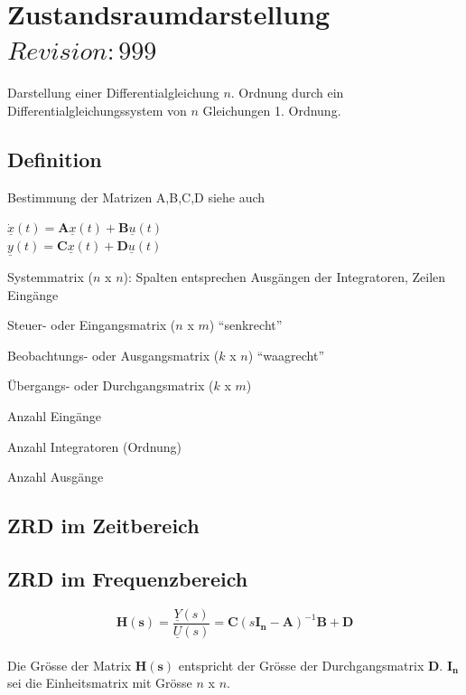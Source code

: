\section{Zustandsraumdarstellung  \tiny{$Revision: 999 $}}
Darstellung einer Differentialgleichung $n$. Ordnung durch ein
Differentialgleichungssystem von $n$ Gleichungen 1. Ordnung.

\subsection{Definition }
\begin{multicols}{2}
	
	Bestimmung der Matrizen A,B,C,D siehe auch 
	
	$\dot{\underline{x}}(t) = {\boldsymbol A} \underline{x}(t) + {\boldsymbol B} \underline{u}(t)$ \\
	$\underline{y}(t) = {\boldsymbol C} \underline{x}(t) + {\boldsymbol D} \underline{u}(t)$
		
	\begin{description}[noitemsep, style=multiline, leftmargin=15pt]
  		\item[A] Systemmatrix ($n$ x $n$): Spalten entsprechen Ausgängen der Integratoren, Zeilen Eingänge
  		\item[B] Steuer- oder Eingangsmatrix ($n$ x $m$) ``senkrecht''
  		\item[C] Beobachtungs- oder Ausgangsmatrix ($k$ x $n$) ``waagrecht''
  		\item[D] Übergangs- oder Durchgangsmatrix ($k$ x $m$) \\
  		\item[m] Anzahl Eingänge
  		\item[n] Anzahl Integratoren (Ordnung)
  		\item[k] Anzahl Ausgänge
	\end{description}	
\end{multicols}

\subsection{ZRD im Zeitbereich }

\subsection{ZRD im Frequenzbereich  }
$$\boldsymbol{H(s)} = \frac{\underline{Y}(s)}{\underline{U}(s)} =
\boldsymbol{C}\left(s\boldsymbol{I_n}-\boldsymbol{A}\right)^{-1}\boldsymbol{B}+\boldsymbol{D}$$
\\
Die Grösse der Matrix $\boldsymbol {H(s)}$ entspricht der Grösse der
Durchgangsmatrix $\boldsymbol D$. $\boldsymbol{I_n}$ sei die Einheitsmatrix mit
Grösse $n$ x $n$.

